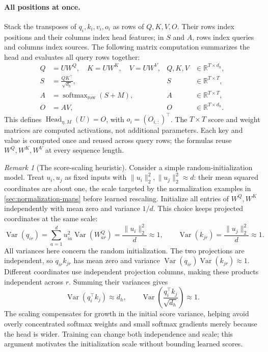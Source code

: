 \documentclass[11pt,twoside]{article}
\DeclareMathOperator{\softmax}{softmax}
\newcommand{\R}{\mathbb R}
\theoremstyle{plain}
\theoremstyle{definition}
\theoremstyle{remark}
\newtheorem{remark}{Remark}[section]
\begin{document}
\paragraph{All positions at once.}
Stack the transposes of $q_i,k_i,v_i,o_i$ as rows of $Q,K,V,O$.
Their rows index positions and their columns index head features;
in $S$ and $A$, rows index queries and columns index sources.
The following matrix computation summarizes the head and evaluates all
query rows together:
\begin{equation}
\begin{aligned}
Q&=UW^Q,\quad K=UW^K,\quad V=UW^V,
& Q,K,V&\in\R^{T\times d_h},\\
S&=\frac{QK^\top}{\sqrt{d_h}},
& S&\in\R^{T\times T},\\
A&=\softmax_{\mathrm{row}}(S+M),
& A&\in\R^{T\times T},\\
O&=AV,
& O&\in\R^{T\times d_h}.
\end{aligned}
\label{eq:self-attention-heads}
\end{equation}
This defines $\operatorname{Head}_{\eta,M}(U)=O$, with
$o_i=(O_{i,:})^\top$. The $T\times T$ score and weight matrices are
computed activations, not additional parameters. Each key and value is
computed once and reused across query rows; the formulas reuse
$W^Q,W^K,W^V$ at every sequence length.

\begin{remark}[The score-scaling heuristic]
\label{rem:attention-scaling}
Consider a simple random-initialization model. Treat $u_i,u_j$ as fixed
inputs with $\|u_i\|_2^2,\|u_j\|_2^2\approx d$: their mean squared coordinates
are about one, the scale targeted by the normalization examples in
\cref{sec:normalization-maps} before learned rescaling.
Initialize all entries of $W^Q,W^K$ independently with mean zero and
variance $1/d$. This choice keeps projected coordinates at the same scale:
\[
\operatorname{Var}(q_{ir})
=\sum_{a=1}^d u_{ia}^2\operatorname{Var}(W^Q_{ar})
=\frac{\|u_i\|_2^2}{d}\approx1,
\qquad
\operatorname{Var}(k_{jr})=\frac{\|u_j\|_2^2}{d}\approx1.
\]
All variances here concern the random initialization.
The two projections are independent, so $q_{ir}k_{jr}$ has mean zero and
variance $\operatorname{Var}(q_{ir})\operatorname{Var}(k_{jr})\approx1$.
Different coordinates use independent projection columns, making these
products independent across $r$. Summing their variances gives
\[
\operatorname{Var}(q_i^\top k_j)\approx d_h,
\qquad
\operatorname{Var}\!\left(\frac{q_i^\top k_j}{\sqrt{d_h}}\right)\approx1.
\]
The scaling compensates for growth in the initial score variance, helping
avoid overly concentrated softmax weights and small softmax gradients
merely because the head is wider.
Training can change both independence and scale; this argument motivates
the initialization scale without bounding learned scores.
\end{remark}
\end{document}
